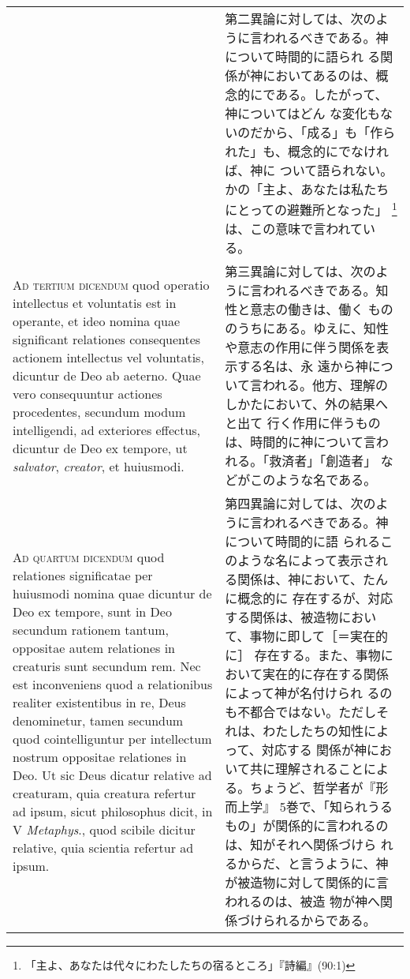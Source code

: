 \documentclass[10pt]{jsarticle} %
\begin{document}
\begin{longtable}{p{21em}p{21em}}
& 


第二異論に対しては、次のように言われるべきである。神について時間的に語られ
る関係が神においてあるのは、概念的にである。したがって、神についてはどん
な変化もないのだから、「成る」も「作られた」も、概念的にでなければ、神に
ついて語られない。かの「主よ、あなたは私たちにとっての避難所となった」
 \footnote{「主よ、あなたは代々にわたしたちの宿るところ」『詩編』(90:1)}
は、この意味で言われている。

\\



{\scshape Ad tertium dicendum} quod operatio intellectus et voluntatis
est in operante, et ideo nomina quae significant relationes
consequentes actionem intellectus vel voluntatis, dicuntur de Deo ab
aeterno. Quae vero consequuntur actiones procedentes, secundum modum
intelligendi, ad exteriores effectus, dicuntur de Deo ex tempore, ut
{\itshape salvator}, {\itshape creator}, et huiusmodi.


&

第三異論に対しては、次のように言われるべきである。知性と意志の働きは、働く
もののうちにある。ゆえに、知性や意志の作用に伴う関係を表示する名は、永
遠から神について言われる。他方、理解のしかたにおいて、外の結果へと出て
行く作用に伴うものは、時間的に神について言われる。「救済者」「創造者」
などがこのような名である。

\\


{\scshape Ad quartum dicendum} quod relationes significatae per
huiusmodi nomina quae dicuntur de Deo ex tempore, sunt in Deo secundum
rationem tantum, oppositae autem relationes in creaturis sunt secundum
rem. Nec est inconveniens quod a relationibus realiter existentibus in
re, Deus denominetur, tamen secundum quod cointelliguntur per
intellectum nostrum oppositae relationes in Deo. Ut sic Deus dicatur
relative ad creaturam, quia creatura refertur ad ipsum, sicut
philosophus dicit, in V {\itshape Metaphys}., quod scibile dicitur
relative, quia scientia refertur ad ipsum.


&

第四異論に対しては、次のように言われるべきである。神について時間的に語
られるこのような名によって表示される関係は、神において、たんに概念的に
存在するが、対応する関係は、被造物において、事物に即して［＝実在的に］
存在する。また、事物において実在的に存在する関係によって神が名付けられ
るのも不都合ではない。ただしそれは、わたしたちの知性によって、対応する
関係が神において共に理解されることによる。ちょうど、哲学者が『形而上学』
5巻で、「知られうるもの」が関係的に言われるのは、知がそれへ関係づけら
れるからだ、と言うように、神が被造物に対して関係的に言われるのは、被造
物が神へ関係づけられるからである。




\end{longtable}
\end{document}
